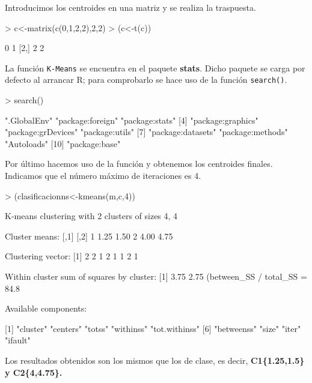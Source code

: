 \documentclass [a4paper] {article}
\begin{document}
\bigskip
Introducimos los centroides en una matriz y se realiza la traspuesta.
\begin{Schunk}
\begin{Sinput}
> c<-matrix(c(0,1,2,2),2,2)
> (c<-t(c))
\end{Sinput}
\begin{Soutput}
     [,1] [,2]
[1,]    0    1
[2,]    2    2
\end{Soutput}
\end{Schunk}

\bigskip
La función \texttt{K-Means} se encuentra en el paquete \textbf{stats}. Dicho paquete se carga por defecto al
arrancar R; para comprobarlo se hace uso de la función \texttt{search()}.
\begin{Schunk}
\begin{Sinput}
> search()
\end{Sinput}
\begin{Soutput}
 [1] ".GlobalEnv"        "package:foreign"   "package:stats"    
 [4] "package:graphics"  "package:grDevices" "package:utils"    
 [7] "package:datasets"  "package:methods"   "Autoloads"        
[10] "package:base"     
\end{Soutput}
\end{Schunk}

\bigskip
Por último hacemos uso de la función y obtenemos los centroides finales. Indicamos que el número máximo de
iteraciones es 4.
\begin{Schunk}
\begin{Sinput}
> (clasificacionns<-kmeans(m,c,4))
\end{Sinput}
\begin{Soutput}
K-means clustering with 2 clusters of sizes 4, 4

Cluster means:
  [,1] [,2]
1 1.25 1.50
2 4.00 4.75

Clustering vector:
[1] 2 2 1 2 1 1 2 1

Within cluster sum of squares by cluster:
[1] 3.75 2.75
 (between_SS / total_SS =  84.8 %)

Available components:

[1] "cluster"      "centers"      "totss"        "withinss"     "tot.withinss"
[6] "betweenss"    "size"         "iter"         "ifault"      
\end{Soutput}
\end{Schunk}

\bigskip
Los resultados obtenidos son los mismos que los de clase, es decir, \textbf{C1\{1.25,1.5\} y C2\{4,4.75\}.}
\end{document}
